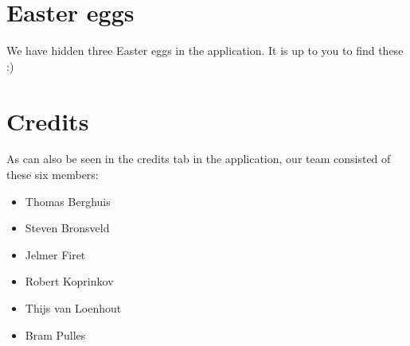\documentclass{article}
\begin{document}
\section*{Easter eggs}
We have hidden three Easter eggs in the application. It is up to you to find these :)

\section*{Credits}
As can also be seen in the credits tab in the application, our team consisted of these six members:
\begin{itemize}	
	\item Thomas Berghuis
	\item Steven Bronsveld
	\item Jelmer Firet	
	\item Robert Koprinkov
	\item Thijs van Loenhout
	\item Bram Pulles
\end{itemize}
	
\end{document}
